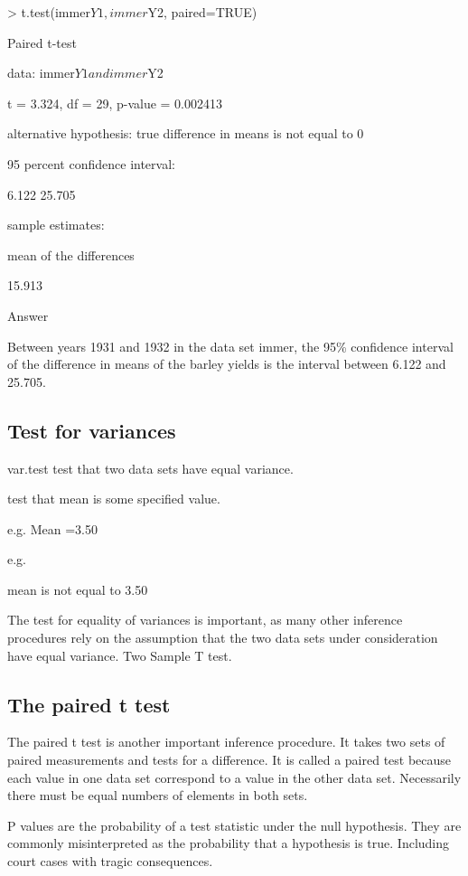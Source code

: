 > t.test(immer$Y1, immer$Y2, paired=TRUE) 



          Paired t-test 



data:  immer$Y1 and immer$Y2 

t = 3.324, df = 29, p-value = 0.002413 

alternative hypothesis: true difference in means is not equal to 0 

95 percent confidence interval: 

 6.122 25.705 

sample estimates: 

mean of the differences 

                15.913

Answer

Between years 1931 and 1932 in the data set immer, the 95\% confidence interval of the difference in means of the barley yields is the interval between 6.122 and 25.705.

\subsection{Test for variances}


var.test test that two data sets have equal variance.


test that mean is some specified value. 


e.g. Mean =3.50

e.g. 

mean is not equal to 3.50 


The test for equality of variances is important, as many other inference procedures rely on the assumption that the two data sets under consideration have equal variance. Two Sample T test.

\subsection{The paired t test }

The paired t test is another important inference procedure. It takes two sets of paired measurements and tests for a difference. It is called a paired test because each value in one data set  correspond to a value in the other data set. Necessarily there must be equal numbers of elements in both sets.


P values are the probability of a test statistic under the null hypothesis. They are commonly misinterpreted as the probability that a hypothesis is true. Including court cases with tragic consequences.


